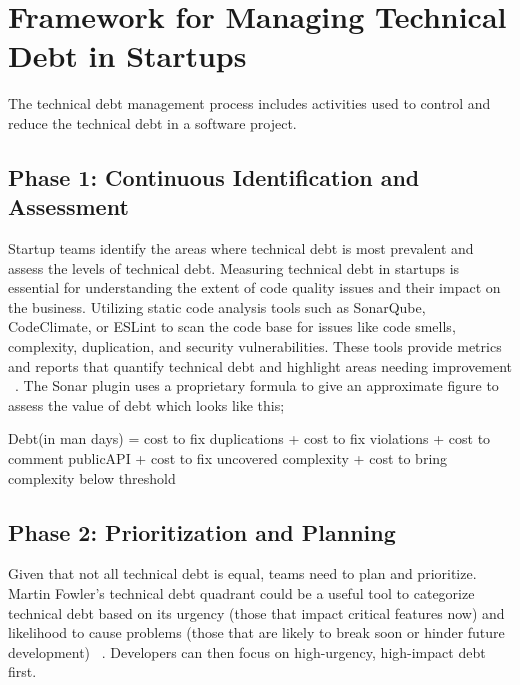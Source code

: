 \section{Framework for Managing Technical Debt in Startups}
\label{Sec:Framework}


The technical debt management process includes activities used to control and reduce the technical debt in a software project.

\subsection{ Phase 1: Continuous Identification and Assessment}
Startup teams identify the areas where technical debt is most prevalent and assess the levels of technical debt.
Measuring technical debt in startups is essential for understanding the extent of code quality issues and their impact on the business.
Utilizing static code analysis tools such as SonarQube, CodeClimate, or ESLint to scan the code base for issues like code smells, complexity, duplication, and security vulnerabilities.
These tools provide metrics and reports that quantify technical debt and highlight areas needing improvement ~\cite{Whopayso60:online}.
The Sonar plugin uses a proprietary formula to give an approximate figure to assess the value of debt which looks like this;

Debt(in man days) = cost to fix duplications + cost to fix violations + cost to comment publicAPI + cost to fix uncovered complexity + cost to bring complexity below threshold

\subsection{Phase 2: Prioritization and Planning}
Given that not all technical debt is equal, teams need to plan and prioritize. Martin Fowler's technical debt quadrant could be a useful tool to categorize technical debt based on its urgency (those that impact critical features now) and likelihood to cause problems (those that are likely to break soon or hinder future development) ~\cite{martinfowlerTechnical}. Developers can then focus on high-urgency, high-impact debt first.

